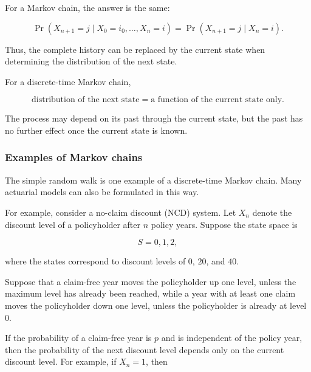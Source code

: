 \documentclass[
  letterpaper,
  DIV=11,
  numbers=noendperiod]{scrartcl}
\theoremstyle{definition}
\theoremstyle{remark}
\begin{document}
For a Markov chain, the answer is the same:

\[
\Pr(X_{n+1}=j\mid X_0=i_0,\ldots,X_n=i)
=\Pr(X_{n+1}=j\mid X_n=i).
\]

Thus, the complete history can be replaced by the current state when
determining the distribution of the next state.

\begin{tcolorbox}[enhanced jigsaw, arc=.35mm, bottomrule=.15mm, bottomtitle=1mm, breakable, colback=white, colbacktitle=quarto-callout-note-color!10!white, colframe=quarto-callout-note-color-frame, coltitle=black, left=2mm, leftrule=.75mm, opacityback=0, opacitybacktitle=0.6, rightrule=.15mm, title=\textcolor{quarto-callout-note-color}{\faInfo}\hspace{0.5em}{Markov property}, titlerule=0mm, toprule=.15mm, toptitle=1mm]

For a discrete-time Markov chain,

\[
\boxed{
\text{distribution of the next state}
=\text{a function of the current state only}.
}
\]

The process may depend on its past through the current state, but the
past has no further effect once the current state is known.

\end{tcolorbox}

\subsubsection{Examples of Markov
chains}\label{examples-of-markov-chains}

The simple random walk is one example of a discrete-time Markov chain.
Many actuarial models can also be formulated in this way.

For example, consider a no-claim discount (NCD) system. Let \(X_n\)
denote the discount level of a policyholder after \(n\) policy years.
Suppose the state space is

\[
S={0,1,2},
\]

where the states correspond to discount levels of \(0%
\), \(20%
\), and \(40%
\).

Suppose that a claim-free year moves the policyholder up one level,
unless the maximum level has already been reached, while a year with at
least one claim moves the policyholder down one level, unless the
policyholder is already at level \(0\).

If the probability of a claim-free year is \(p\) and is independent of
the policy year, then the probability of the next discount level depends
only on the current discount level. For example, if \(X_n=1\), then
\end{document}
